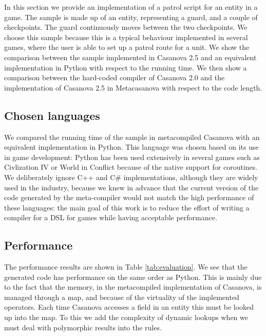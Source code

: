 In this section we provide an implementation of a patrol script for an entity in a game. The sample is made up of an entity, representing a guard, and a couple of checkpoints. The guard continuously moves between the two checkpoints. We choose this sample because this is a typical behaviour implemented in several games, where the user is able to set up a patrol route for a unit. We show the comparison between the sample implemented in Casanova 2.5 and an equivalent implementation in Python with respect to the running time. We then show a comparison between the hard-coded compiler of Casanova 2.0 and the implementation of Casanova 2.5 in Metacasanova with respect to the code length. 

\begin{comment}
We want to underline that the main goal of this work is \textbf{to ease the process of building a compiler for a DSL for games, thus our main objective is decreasing the code length and complexity necessary to implement a hard-coded compiler for the language}. At the same time we show that the compiled program in Casanova 2.5 \textbf{has performance similar to that of a language used in game development, and thus Casanova 2.5 is usable in a real scenario}.
\end{comment}

\subsection{Chosen languages}
We compared the running time of the sample in metacompiled Casanova with an equivalent implementation in Python. This language was chosen based on its use in game development: Python has been used extensively in several games such as Civlization IV \cite{CIV4} or World in Conflict \cite{WIC} because of the native support for coroutines. We deliberately ignore C++ and C\# implementations, although they are widely used in the industry, because we knew in advance \cite{CASANOVA2_PAPER} that the current version of the code generated by the meta-compiler would not match the high performance of these languages: the main goal of this work is to reduce the effort of writing a compiler for a DSL for games while having acceptable performance.


\subsection{Performance}
The performance results are shown in Table \ref{tab:evaluation}. We see that the generated code has performance on the same order as Python. This is mainly due to the fact that the memory, in the metacompiled implementation of Casanova, is managed through a map, and because of the virtuality of the implemented operators. Each time Casanova accesses a field in an entity this must be looked up into the map. To this we add the complexity of dynamic lookups when we must deal with polymorphic results into the rules. 

